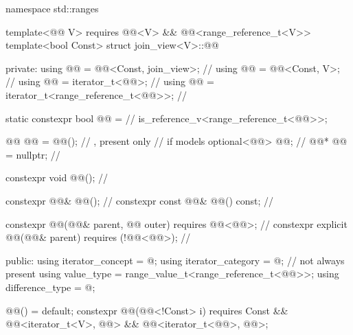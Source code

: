 \begin{codeblock}
namespace std::ranges {
  template<@@ V>
    requires @@<V> && @@<range_reference_t<V>>
  template<bool Const>
  struct join_view<V>::@@ {
  private:
    using @@    = @@<Const, join_view>;            // \expos
    using @@      = @@<Const, V>;                    // \expos
    using @@ = iterator_t<@@>;                         // \expos
    using @@ = iterator_t<range_reference_t<@@>>;      // \expos

    static constexpr bool @@ =                      // \expos
      is_reference_v<range_reference_t<@@>>;

    @@ @@ = @@();                     // \expos, present only
                                                        // if  models 
    optional<@@> @@;                                 // \expos
    @@* @@  = nullptr;                                 // \expos

    constexpr void @@();                                   // \expos

    constexpr @@& @@();                               // \expos
    constexpr const @@& @@() const;                   // \expos

    constexpr @@(@@& parent, @@ outer)
      requires @@<@@>;                             // \expos
    constexpr explicit @@(@@& parent)
      requires (!@@<@@>);                          // \expos

  public:
    using iterator_concept  = @\seebelow@;
    using iterator_category = @\seebelow@;                        // not always present
    using value_type        = range_value_t<range_reference_t<@@>>;
    using difference_type   = @\seebelow@;

    @@() = default;
    constexpr @@(@@<!Const> i)
      requires Const &&
               @@<iterator_t<V>, @@> &&
               @@<iterator_t<@@>, @@>;

}}
\end{codeblock}
